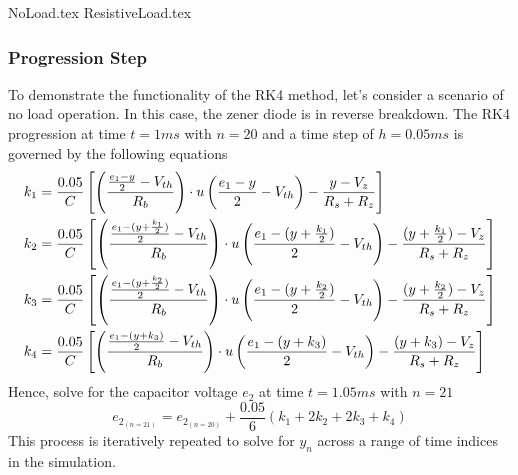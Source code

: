 {NoLoad.tex}
{ResistiveLoad.tex}

\subsubsection{Progression Step}
To demonstrate the functionality of the RK4 method, let's consider a scenario of no load operation. In this case, the zener diode is in reverse breakdown. The RK4 progression at time $t=1ms$ with $n=20$ and a time step of $h=0.05ms$ is governed by the following equations
\begin{equation}
	\begin{split}
		k_1 &= \frac{0.05}{C}\left[\left(\frac{\frac{e_1 - y}{2} - V_{th}}{R_b} \right)\cdot u\left(\frac{e_1 - y}{2} - V_{th} \right)-\frac{y-V_z}{R_s+R_z} \right] \\
	k_2 &= \frac{0.05}{C}\left[\left(\frac{\frac{e_1 - (y+\frac{k_1}{2})}{2} - V_{th}}{R_b} \right)\cdot u\left(\frac{e_1 - (y+\frac{k_1}{2})}{2} - V_{th} \right)-\frac{(y+\frac{k_1}{2})-V_z}{R_s+R_z} \right] \\
	k_3 &= \frac{0.05}{C}\left[\left(\frac{\frac{e_1 - (y+\frac{k_2}{2})}{2} - V_{th}}{R_b} \right)\cdot u\left(\frac{e_1 - (y+\frac{k_2}{2})}{2} - V_{th} \right)-\frac{(y+\frac{k_2}{2})-V_z}{R_s+R_z} \right] \\
	k_4 &= \frac{0.05}{C}\left[\left(\frac{\frac{e_1 - (y+k_3)}{2} - V_{th}}{R_b} \right)\cdot u\left(\frac{e_1 - (y+k_3)}{2} - V_{th} \right)-\frac{(y+k_3)-V_z}{R_s+R_z} \right]
	\end{split}
\end{equation}
Hence, solve for the capacitor voltage $e_2$ at time $t=1.05ms$ with $n=21$
\begin{equation}
	e_2_{(n=21)} = e_2_{(n=20)} + \frac{0.05}{6}(k_1+2k_2+2k_3+k_4)
\end{equation}
This process is iteratively repeated to solve for $y_n$ across a range of time indices in the simulation.

